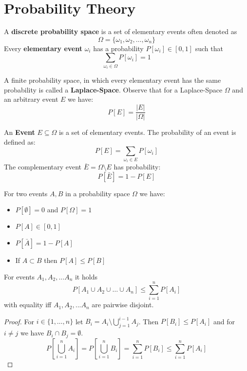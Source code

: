 \section{Probability Theory}

\begin{definition}
	A \textbf{discrete probability space} is a set of elementary events often denoted as
	$$\Omega = \{ \omega_1, \omega_2, \dots, \omega_n \}$$
	Every \textbf{elementary event} $\omega_i$ has a probability $P[\omega_i] \in [0,1]$ such that
	$$\sum_{\omega_i \in \Omega} P[\omega_i] = 1$$
\end{definition}

\begin{remark}
	A finite probability space, in which every elementary event has the same probability is called a
	\textbf{Laplace-Space}. Observe that for a Laplace-Space $\Omega$ and an arbitrary event $E$ we have:
	$$P[E] = \frac{\vert E \vert}{\vert \Omega \vert}$$
\end{remark}

\begin{definition}
	An \textbf{Event} $E \subseteq \Omega$ is a set of elementary events. The probability of an event is defined as:
	$$P[E] = \sum_{\omega_i \in E} P[\omega_i]$$
	The complementary event $\bar{E} = \Omega \setminus E$ has probability:
	$$P[\bar{E}] = 1 - P[E]$$
\end{definition}

\begin{theorem}
	For two events $A, B$ in a probability space $\Omega$ we have:
	\begin{itemize}
		\item $P[\emptyset] = 0$ and $P[\Omega] = 1$
		\item $P[A] \in [0,1]$
		\item $P[\bar{A}] = 1 - P[A]$
		\item If $A \subset B$ then $P[A] \le P[B]$
	\end{itemize}
\end{theorem}

\begin{theorem}
	For events $A_1, A_2, ... A_n$ it holds
	$$P[A_1 \cup A_2 \cup \dots \cup A_n] \leq \sum_{i=1}^n P[A_i]$$
	with equality iff $A_1, A_2, ... A_n$ are pairwise disjoint.
\end{theorem}

\begin{proof}
	For $i \in \{1, \dots, n\}$ let $B_i = A_i \setminus \bigcup_{j=1}^{i-1} A_j$. Then $P[B_i] \leq P[A_i]$ and for $i \neq j$ we have $B_i \cap B_j = \emptyset$.
	$$P[\bigcup_{i=1}^n A_i] = P[\bigcup_{i=1}^n B_i] = \sum_{i=1}^n P[B_i] \leq \sum_{i=1}^n P[A_i]$$
\end{proof}

